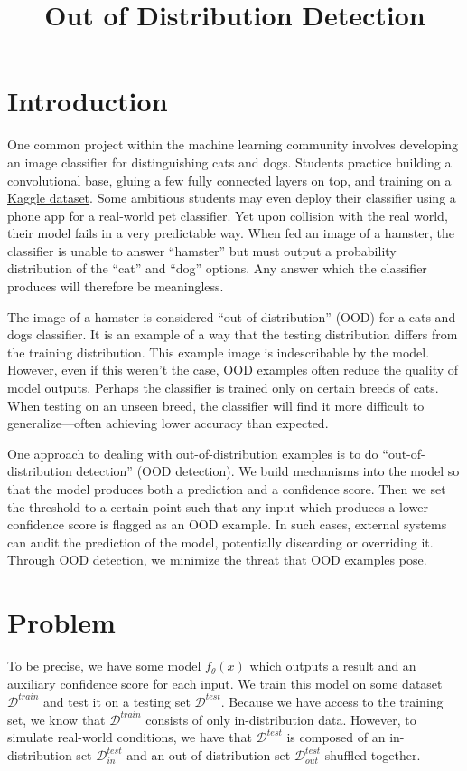 \documentclass{article}
\title{Out of Distribution Detection}
\newcommand{\D}{\mathcal{D}}
\begin{document}
\maketitle

\section{Introduction}
One common project within the machine learning community involves developing an image classifier for distinguishing cats and dogs. Students practice building a convolutional base, gluing a few fully connected layers on top, and training on a \href{https://www.kaggle.com/c/dogs-vs-cats}{Kaggle dataset}. Some ambitious students may even deploy their classifier using a phone app for a real-world pet classifier. Yet upon collision with the real world, their model fails in a very predictable way. When fed an image of a hamster, the classifier is unable to answer “hamster” but must output a probability distribution of the “cat” and “dog” options. Any answer which the classifier produces will therefore be meaningless. 

The image of a hamster is considered “out-of-distribution” (OOD)  for a cats-and-dogs classifier. It is an example of a way that the testing distribution differs from the training distribution. This example image is indescribable by the model. However, even if this weren’t the case, OOD examples often reduce the quality of model outputs. Perhaps the classifier is trained only on certain breeds of cats. When testing on an unseen breed, the classifier will find it more difficult to generalize—often achieving lower accuracy than expected.

One approach to dealing with out-of-distribution examples is to do ``out-of-distribution detection'' (OOD detection). We build mechanisms into the model so that the model produces both a prediction and a confidence score. Then we set the threshold to a certain point such that any input which produces a lower confidence score is flagged as an OOD example. In such cases, external systems can audit the prediction of the model, potentially discarding or overriding it. Through OOD detection, we minimize the threat that OOD examples pose. 

\section{Problem}
To be precise, we have some model $f_\theta(x)$ which outputs a result and an auxiliary confidence score for each input. We train this model on some dataset $\D^{train}$ and test it on a testing set $\D^{test}$. Because we have access to the training set, we know that $\D^{train}$ consists of only in-distribution data. However, to simulate real-world conditions, we have that $\D^{test}$ is composed of an in-distribution set $\D_{in}^{test}$ and an out-of-distribution set $\D_{out}^{test}$ shuffled together.
\end{document}
